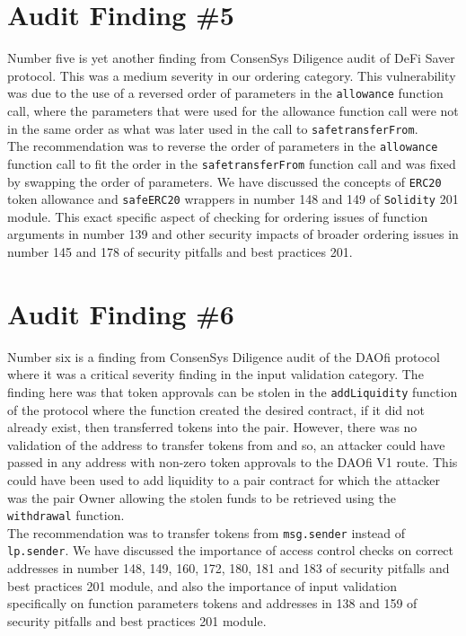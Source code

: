 \section{Audit Finding \#5}

Number five is yet another finding from ConsenSys Diligence audit of DeFi Saver protocol. This was a medium severity in our ordering category. This vulnerability was due to the use of a reversed order of parameters in the \verb|allowance| function call, where the parameters that were used for the allowance function call were not in the same order as what was later used in the call to \verb|safetransferFrom|.\\

The recommendation was to reverse the order of parameters in the \verb|allowance| function call to fit the order in the \verb|safetransferFrom| function call and was fixed by swapping the order of parameters. We have discussed the concepts of \verb|ERC20| token allowance and \verb|safeERC20| wrappers in number 148 and 149 of \verb|Solidity| 201 module. This exact specific aspect of checking for ordering issues of function arguments in number 139 and other security impacts of broader ordering issues in number 145 and 178 of security pitfalls and best practices 201.

\section{Audit Finding \#6}

Number six is a finding from ConsenSys Diligence audit of the DAOfi protocol where it was a critical severity finding in the input validation category. The finding here was that token approvals can be stolen in the \verb|addLiquidity| function of the protocol where the function created the desired contract, if it did not already exist, then transferred tokens into the pair. However, there was no validation of the address to transfer tokens from and so, an attacker could have passed in any address with non-zero token approvals to the DAOfi V1 route. This could have been used to add liquidity to a pair contract for which the attacker was the pair Owner allowing the stolen funds to be retrieved using the \verb|withdrawal| function.\\

The recommendation was to transfer tokens from \verb|msg.sender| instead of \verb|lp.sender|. We have discussed the importance of access control checks on correct addresses in number 148, 149, 160, 172, 180, 181 and 183 of security pitfalls and best practices 201 module, and also the importance of input validation specifically on function parameters tokens and addresses in 138 and 159 of security pitfalls and best practices 201 module.

